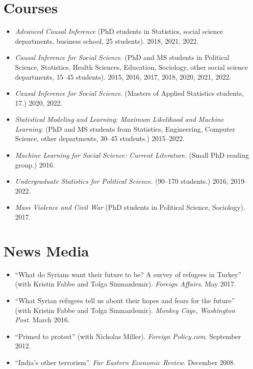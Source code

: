 \documentclass[11pt]{article}
\begin{document}
\section{Courses}
\begin{itemize}
\item \textit{Advanced Causal Inference} (PhD students in Statistics, social science departments, business school, 25 students). 2018, 2021, 2022.
\item \textit{Causal Inference for Social Science}. (PhD and MS students in Political Science, Statistics, Health Sciences, Education, Sociology, other social science departments, 15--45 students). 2015, 2016, 2017, 2018, 2020, 2021, 2022.
\item \textit{Causal Inference for Social Science}. (Masters of Applied Statistics students, 17.) 2020, 2022.
\item \textit{Statistical Modeling and Learning: Maximum Likelihood and Machine Learning}. (PhD and MS students from Statistics, Engineering, Computer Science, other departments, 30--45 students.) 2015--2022.
\item \textit{Machine Learning for Social Science: Current Literature.} (Small PhD reading group.) 2016.
\item \textit{Undergraduate Statistics for Political Science.} (90--170 students.) 2016, 2019--2022.
\item \textit{Mass Violence and Civil War} (PhD students in Political Science, Sociology). 2017.
\end{itemize}

\section{News Media}
\begin{itemize}
\item ``What do Syrians want their future to be? A survey of refugees in Turkey'' (with Kristin Fabbe and Tolga Sinmazdemir). \textit{Foreign Affairs}. May 2017.
\item ``What Syrian refugees tell us about their hopes and fears for the future'' (with Kristin Fabbe and Tolga Sinmazdemir). \textit{Monkey Cage, Washington Post}. March 2016.
\item ``Primed to protest'' (with Nicholas Miller). \emph{Foreign Policy.com}. September 2012.
\item ``India's other terrorism''. \emph{Far Eastern Economic Review}. December 2008.
\end{itemize}
\end{document}
